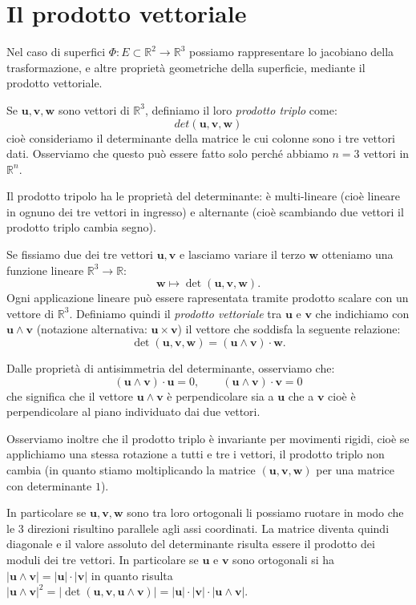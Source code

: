 \documentclass[italian,a4paper]{scrartcl}
\newcommand{\RR}{{\mathbb R}}
\renewcommand{\vec}{\mathbf}
\begin{document}
\section{Il prodotto vettoriale}

Nel caso di superfici $\Phi\colon E \subset \RR^2 \to \RR^3$ possiamo
rappresentare lo jacobiano della trasformazione, e altre proprietà
geometriche della superficie, mediante il prodotto vettoriale.

Se $\vec u, \vec v, \vec w$ sono vettori di $\RR^3$,
definiamo il loro \emph{prodotto triplo} come:
\[
  det (\vec u, \vec v, \vec w)
\]
cioè consideriamo il determinante della matrice le cui colonne sono i
tre vettori dati. Osserviamo che questo può essere fatto solo perché
abbiamo $n=3$ vettori in $\RR^n$.

Il prodotto tripolo ha le proprietà del determinante: è multi-lineare
(cioè lineare in ognuno dei tre vettori in ingresso) e alternante
(cioè scambiando due vettori il prodotto triplo cambia segno).

Se fissiamo due dei tre vettori $\vec u, \vec v$ e lasciamo
variare il terzo $\vec w$ otteniamo una funzione lineare $\RR^3 \to
\RR$:
\[
 \vec w \mapsto \det(\vec u, \vec v, \vec w).
\]
Ogni applicazione lineare può essere rapresentata tramite prodotto
scalare con un vettore di $\RR^3$. Definiamo quindi il \emph{prodotto
  vettoriale} tra $\vec u$ e $\vec v$ che indichiamo con
$\vec u \wedge \vec v$ (notazione alternativa: $\vec u \times
\vec v$) il vettore che soddisfa la seguente relazione:
\[
\det (\vec u, \vec v, \vec w) = (\vec u \wedge \vec v) \cdot \vec w.
\]

Dalle proprietà di antisimmetria del determinante, osserviamo che:
\[
(\vec u \wedge \vec v)\cdot \vec u = 0, \qquad
(\vec u \wedge \vec v)\cdot \vec v = 0
\]
che significa che il vettore $\vec u \wedge \vec v$ è perpendicolare sia a
$\vec u$ che a $\vec v$ cioè è perpendicolare al piano individuato dai
due vettori.

Osserviamo inoltre che il prodotto triplo è invariante per movimenti
rigidi, cioè se applichiamo una stessa rotazione a tutti e tre i
vettori, il prodotto triplo non cambia (in quanto stiamo moltiplicando la
matrice $(\vec u,\vec v,\vec w)$ per una matrice con determinante $1$).

In particolare se $\vec u, \vec v, \vec w$ sono tra loro ortogonali li
possiamo ruotare in modo che le 3 direzioni risultino parallele agli
assi coordinati. La matrice diventa quindi diagonale e il valore assoluto
del determinante risulta essere il prodotto dei moduli dei tre vettori.
In particolare se
$\vec u$ e $\vec v$ sono ortogonali si ha $\lvert \vec u \wedge \vec
v\rvert = \lvert \vec u \rvert \cdot \lvert \vec v \rvert$ in quanto
risulta $\lvert \vec u \wedge \vec v\rvert^2 = \lvert\det (\vec u, \vec v,
\vec u \wedge \vec v)\rvert = \lvert \vec u \rvert \cdot \lvert \vec v
\rvert \cdot \lvert \vec u \wedge \vec v \rvert$.
\end{document}
